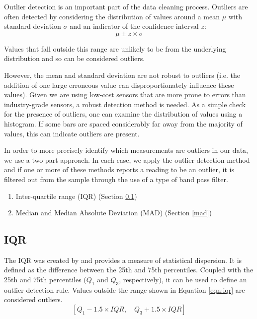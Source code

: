 \documentclass[11pt]{report}
\begin{document}
Outlier detection is an important part of the data cleaning process. Outliers are often detected by considering the distribution of values around a mean $\mu$ with standard deviation $\sigma$ and an indicator of the confidence interval $z$:
\begin{equation}
\mu \pm z \times \sigma
\end{equation}

Values that fall outside this range are unlikely to be from the underlying distribution and so can be considered outliers.

However, the mean and standard deviation are not robust to outliers (i.e. the addition of one large erroneous value can disproportionately influence these values). Given we are using low-cost sensors that are more prone to errors than industry-grade sensors, a robust detection method is needed. As a simple check for the presence of outliers, one can examine the distribution of values using a histogram. If some bars are spaced considerably far away from the majority of values, this can indicate outliers are present.

In order to more precisely identify which measurements are outliers in our data, we use a two-part approach. In each case, we apply the outlier detection method and if one or more of these methods reports a reading to be an outlier, it is filtered out from the sample through the use of a type of band pass filter.
\begin{enumerate}
\item Inter-quartile range (IQR) (Section \ref{iqr})
\item Median and Median Absolute Deviation (MAD) (Section \ref{mad})
\end{enumerate}


\subsection{IQR} \label{iqr}

The IQR was created by \cite{tukey1977iqr} and provides a measure of statistical dispersion. It is defined as the difference between the 25th and 75th percentiles. Coupled with the 25th and 75th percentiles ($Q_1$ and $Q_3$, respectively), it can be used to define an outlier detection rule. Values outside the range shown in Equation \ref{eqn:iqr} are considered outliers.
\begin{equation} \label{eqn:iqr}
[ Q_1 - 1.5 \times IQR, \quad Q_3 + 1.5 \times IQR]
\end{equation}
\end{document}
